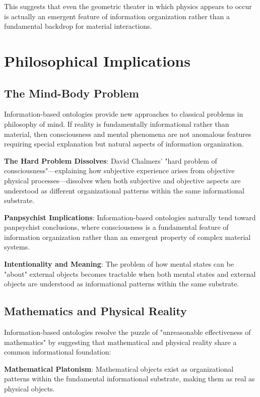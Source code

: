 \documentclass[12pt]{article}
\begin{document}
This suggests that even the geometric theater in which physics appears to occur is actually an emergent feature of information organization rather than a fundamental backdrop for material interactions.

\section{Philosophical Implications}

\subsection{The Mind-Body Problem}

Information-based ontologies provide new approaches to classical problems in philosophy of mind. If reality is fundamentally informational rather than material, then consciousness and mental phenomena are not anomalous features requiring special explanation but natural aspects of information organization.

\textbf{The Hard Problem Dissolves}: David Chalmers' "hard problem of consciousness"—explaining how subjective experience arises from objective physical processes—dissolves when both subjective and objective aspects are understood as different organizational patterns within the same informational substrate.

\textbf{Panpsychist Implications}: Information-based ontologies naturally tend toward panpsychist conclusions, where consciousness is a fundamental feature of information organization rather than an emergent property of complex material systems.

\textbf{Intentionality and Meaning}: The problem of how mental states can be "about" external objects becomes tractable when both mental states and external objects are understood as informational patterns within the same substrate.

\subsection{Mathematics and Physical Reality}

Information-based ontologies resolve the puzzle of "unreasonable effectiveness of mathematics" by suggesting that mathematical and physical reality share a common informational foundation:

\textbf{Mathematical Platonism}: Mathematical objects exist as organizational patterns within the fundamental informational substrate, making them as real as physical objects.
\end{document}
